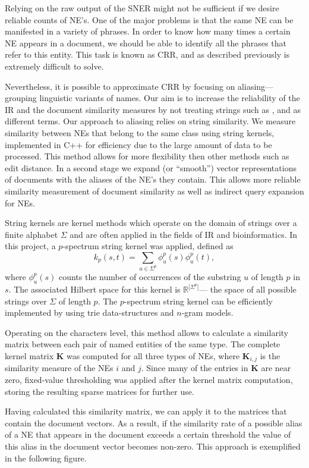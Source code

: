 Relying on the raw output of the SNER might not be sufficient if we desire reliable counts of NE's. One of the major problems is that the same
NE can be manifested in a variety of phrases. In order to know how many times a certain NE appears in a document, we should be able to identify all the phrases that refer to this entity. This task is known as CRR, and as described previously is extremely difficult to solve.

Nevertheless, it is possible to approximate CRR by focusing on aliasing--- grouping linguistic variants of names. Our aim is to increase the reliability of the IR and the document similarity measures by not treating strings such as  ,  and  as different terms. Our approach to aliasing relies on string similarity. We measure similarity between NEs that belong to the same class using string kernels, implemented in C++ for efficiency due to the large amount of data to be processed. This method allows for more flexibility then other methods such as edit distance. In a second stage we expand (or ``smooth'') vector representations of documents with the aliases of the NE's they contain. This allows more reliable similarity measurement of document similarity as well as indirect query expansion for NEs. 

String kernels are kernel methods which operate on the domain of strings over
a finite alphabet $\Sigma$ and are often applied in the fields of IR and bioinformatics. In this project, a
$p$-spectrum string kernel was applied, defined as
\[k_p(s,t) = \sum_{u \in \Sigma^p}{\phi_u^p(s)\phi_u^p(t)},\]
where $\phi_u^p(s)$ counts the number of occurrences of the substring $u$ of length $p$ in $s$. The
associated Hilbert space for this kernel is $\mathbb{R}^{|\Sigma^p|}$--- the space of all possible
strings over $\Sigma$ of length $p$. The $p$-spectrum string kernel can be efficiently implemented by using trie data-structures and $n$-gram models.

Operating on the characters level, this method allows to calculate a similarity matrix between each pair of named entities of the same type. 
The complete kernel matrix $\textbf{K}$ was computed for all three types of NEs, where $\textbf{K}_{i,j}$ is the similarity measure of the NEs $i$ and $j$. Since many of the entries in $\textbf{K}$ are near zero, fixed-value thresholding was applied after the kernel matrix computation, storing the resulting sparse matrices for further use.

Having calculated this similarity matrix, we can apply it to the matrices that contain the document vectors. As a result, if the similarity rate of a possible alias of a NE that appears in the document exceeds a certain threshold the value of this alias in the document vector becomes non-zero. This approach is exemplified in the following figure.


